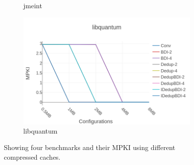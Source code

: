 \begin{figure}
\begin{subfigure}{0.5\textwidth}
        \caption{jmeint}
    \end{subfigure}
    \begin{subfigure}{0.5\textwidth}
        \includegraphics[width=\textwidth]{libquantum-mpki.png}
        \caption{libquantum}
    \end{subfigure}
    \caption[Case Study: MPKI]{Showing four benchmarks and their MPKI using different compressed caches.}
    \label{fig:case_mpki}
\end{figure}
